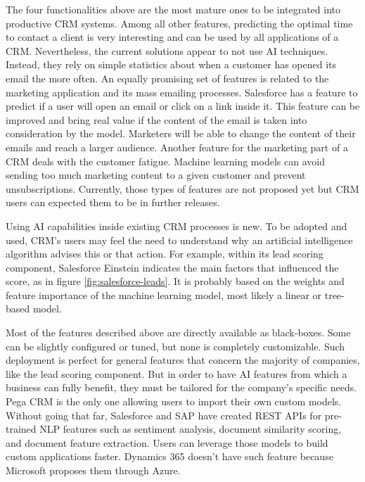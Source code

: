 The four functionalities above are the most mature ones to be integrated into productive CRM systems. Among all other features, predicting the optimal time to contact a client is very interesting and can be used by all applications of a CRM. Nevertheless, the current solutions appear to not use AI techniques. Instead, they rely on simple statistics about when a customer has opened its email the more often. An equally promising set of features is related to the marketing application and its mass emailing processes. Salesforce has a feature to predict if a user will open an email or click on a link inside it. This feature can be improved and bring real value if the content of the email is taken into consideration by the model. Marketers will be able to change the content of their emails and reach a larger audience. Another feature for the marketing part of a CRM deals with the customer fatigue. Machine learning models can avoid sending too much marketing content to a given customer and prevent unsubscriptions. Currently, those types of features are not proposed yet but CRM users can expected them to be in further releases.

Using AI capabilities inside existing CRM processes is new. To be adopted and used, CRM's users may feel the need to understand why an artificial intelligence algorithm advises this or that action. For example, within its lead scoring component, Salesforce Einstein indicates the main factors that influenced the score, as in figure \ref{fig:salesforce-leads}. It is probably based on the weights and feature importance of the machine learning model, most likely a linear or tree-based model.

Most of the features described above are directly available as black-boxes. Some can be slightly configured or tuned, but none is completely customizable. Such deployment is perfect for general features that concern the majority of companies, like the lead scoring component. But in order to have AI features from which a business can fully benefit, they must be tailored for the company's specific needs. Pega CRM is the only one allowing users to import their own custom models. Without going that far, Salesforce and SAP have created REST APIs for pre-trained NLP features such as sentiment analysis, document similarity scoring, and document feature extraction. Users can leverage those models to build custom applications faster. Dynamics 365 doesn't have such feature because Microsoft proposes them through Azure.


